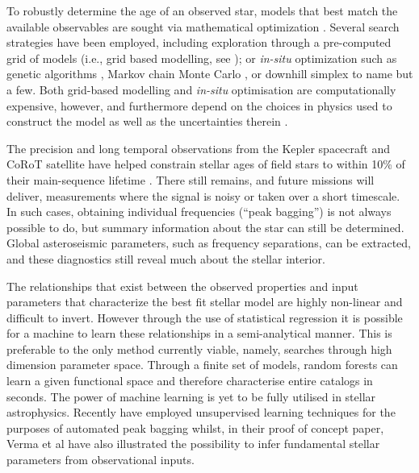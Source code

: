 \documentclass[manuscript]{aastex}
\begin{document}
To robustly determine the age of an observed star, models that best match the available observables are sought via mathematical optimization \citep{1994ApJ...427.1013B}. Several search strategies have been employed, including exploration through a pre-computed grid of models (i.e., grid based modelling, see \citealt{2011ApJ...730...63G, 2014ApJS..210....1C}); or \emph{in-situ} optimization such as genetic algorithms \citep{2014ApJS..214...27M}, Markov chain Monte Carlo \citep{2012MNRAS.427.1847B}, or downhill simplex \citep{2013ApJS..208....4P} to name but a few. Both grid-based modelling and \emph{in-situ} optimisation are computationally expensive, however, and furthermore depend on the choices in physics used to construct the model as well as the uncertainties therein \citep{2014A&A...569A..21L}. 

The precision and long temporal observations from the Kepler spacecraft and CoRoT satellite have helped constrain stellar ages of field stars to within 10\% of their main-sequence lifetime \citep{2015MNRAS.452.2127S}. There still remains, and future missions will deliver, measurements where the signal is noisy or taken over a short timescale. In such cases, obtaining individual frequencies (``peak bagging'') is not always possible to do, but summary information about the star can still be determined. Global asteroseismic parameters, such as frequency separations, can be extracted, and these diagnostics still reveal much about the stellar interior. 

The relationships that exist between the observed properties and input parameters that characterize the best fit stellar model are highly non-linear and difficult to invert.  However through the use of statistical regression it is possible for a machine to learn these relationships in a semi-analytical manner. This is preferable to the only method currently viable, namely, searches through high dimension parameter space. Through a finite set of models, random forests can learn a given functional space and therefore characterise entire catalogs in seconds.  The power of machine learning is yet to be fully utilised in stellar astrophysics. Recently \citet{2016MNRAS.456.2183D} have employed unsupervised learning techniques for the purposes of automated peak bagging whilst, in their proof of concept paper, Verma et al have also illustrated the possibility to infer fundamental stellar parameters from observational inputs. 
\end{document}
